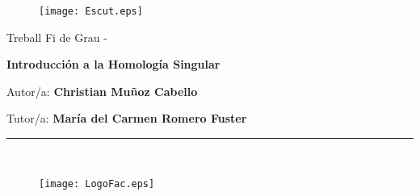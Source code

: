 \begin{titlepage}

\begin{center}
\vspace*{-1in}
\begin{figure}[H]
\begin{center}
\texttt{[image: Escut.eps]}
\end{center}
\end{figure}

\vspace*{0.5in}

\begin{Huge}
Treball Fi de Grau - \@date

\vspace*{0.5in}

\textbf{Introducción a la Homología Singular} \\
\end{Huge}

\vspace*{0.1in}

\begin{huge}


\end{huge}

\vspace*{0.2in}

\begin{huge}
Autor/a: {\bf
Christian Muñoz Cabello} \\
\end{huge}

\vspace*{0.2in}

\begin{Large}
Tutor/a: {\bf \sc
María del Carmen Romero Fuster} \\
\end{Large}

\vspace*{0.5in}

\rule{110mm}{0.1mm}\\


\hspace{-3cm}
\begin{minipage}[t]{.45\textwidth}
\raggedleft
\begin{figure}[H]

\texttt{[image: LogoFac.eps]}
\end{figure}
\end{minipage}
\hfill
\noindent
\begin{minipage}[t]{.45\textwidth}
\raggedleft


\end{minipage}
\end{center}
\end{titlepage}
